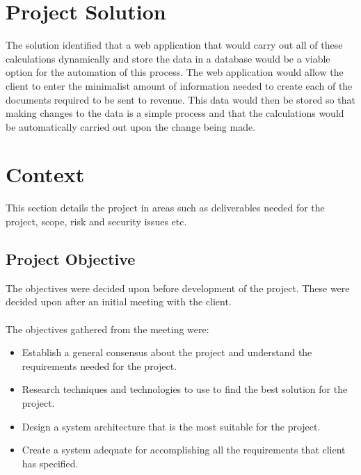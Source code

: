 \section{Project Solution}
The solution identified that a web application that would carry out all of these calculations dynamically and store the data in a database would be a viable option for the automation of this process. The web application would allow the client to enter the minimalist amount of information needed to create each of the documents required to be sent to revenue. This data would then be stored so that making changes to the data is a simple process and that the calculations would be automatically carried out upon the change being made.

\section{Context}
This section details the project in areas such as deliverables needed for the project, scope, risk and security issues etc.

\subsection{Project Objective}
The objectives were decided upon before development of the project. These were decided upon after an initial meeting with the client. \\ \\
The objectives gathered from the meeting were:
\begin{itemize}
    \item  Establish a general consensus about the project and understand the requirements needed for the project. 
    \item Research techniques and technologies to use to ﬁnd the best solution for the project. 
    \item Design a system architecture that is the most suitable for the project.
    \item Create a system adequate for accomplishing all the requirements that client has specified.
\end{itemize}
\newpage

